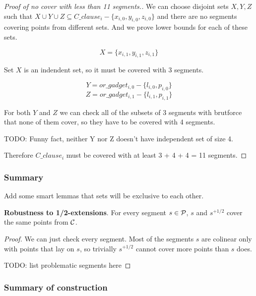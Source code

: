 \begin{proof}[Proof of no cover with less than 11 segments.]

We can choose disjoint sets $X, Y, Z$ such that
$X \cup Y \cup Z \subseteq C\_clause_i - \{x_{i, 0}, y_{i, 0}, z_{i, 0}\}$
and there are no segments covering points from different sets.
And we prove lower bounds for each of these sets.

$$X = \{x_{i, 1}, y_{i, 1}, z_{i, 1}\}$$

Set $X$ is an indendent set, so it must be covered with 3 segments.

$$Y = or\_gadget_{i, 0} - \{l_{i, 0}, p_{i, 0}\}$$
$$Z = or\_gadget_{i, 1} - \{l_{i, 1}, p_{i, 1}\}$$


For both $Y$ and $Z$ we can check all of the subsets of 3 segments
with brutforce that none of them cover, so they have to be covered with
4 segments.

TODO: Funny fact, neither Y nor Z doesn't have independent set of size 4.

Therefore $C\_clause_i$ must be covered with at least 3 + 4 + 4 = 11 segments.
\end{proof}

\subsubsection{Summary}

Add some smart lemmas that sets will be exclusive to each other.

\begin{lemma}
\textbf{Robustness to 1/2-extensions}. For every segment $s \in \mathcal{P}$,
$s$ and $s^{+1/2}$ cover the same points from $\mathcal{C}$.
\end{lemma}

\begin{proof}
We can just check every segment. Most of the segments $s$
are colinear only with points that lay on $s$,
so trivially $s^{+1/2}$ cannot cover more points than $s$ does.

TODO: list problematic segments here
\end{proof}


\subsubsection{Summary of construction}

